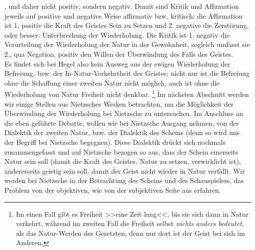\documentclass[12pt, a4paper, openany]{report}
\begin{document}
, und daher nicht positiv, sondern negativ.
Damit sind Kritik und Affirmation jeweils auf positive und negative Weise affirmativ bzw. kritisch:
die Affirmation ist 1. positiv die Kraft des Geistes Sein zu Setzen und 2. negative die Zerstörung, oder besser: 
Unterbrechung der Wiederholung. 
Die Kritik ist 1. negativ die Verurteilung der Wiederholung der Natur in der Gewohnheit, sogleich umfasst sie 2., qua Negation, positiv den Willen der Überwindung des Falls des Geistes.\\

Es findet sich bei Hegel also kein Ausweg aus der ewigen Wiederholung der Befreiung, bzw. der In-Natur-Verkehrtheit des Geistes:
nicht nur ist die Befreiung ohne die Schaffung einer zweiten Natur nicht möglich, auch ist ohne die Wiederholung von Natur Freiheit nicht denkbar.%
\footnote{
    Im einen Fall gibt es Freiheit >>eine Zeit lang<<, bis sie sich dann in Natur verkehrt, während im zweiten Fall die Freiheit selbst \emph{nichts anders bedeutet}, als das Natur-Werden des Gesetzten, denn nur dort ist der Geist bei sich im Anderen.
}
Im nächsten Abschnitt werden wir einige Stellen aus Nietzsches Werken betrachten, um die Möglichkeit der Überwindung der Wiederholung bei Nietzsche zu untersuchen.
Im Anschluss an die eben geführte Debatte, wollen wir bei Nietzsche Ausgang nehmen, von der Dialektik der zweiten Natur, bzw. der Dialektik des Scheins (denn so wird uns der Begriff bei Nietzsche begegnen).
Diese Dialektik drückt sich nochmals zusammengefasst und auf Nietzsche bezogen so aus, dass der Schein einerseits Natur sein soll (damit die Kraft des Geistes, Natur zu setzen, verwirklicht ist), andererseits geistig sein soll, damit der Geist nicht wieder in Natur verfällt. 
Wir werden bei Nietzsche in der Betrachtung des Scheins und des Schauspielers, das Problem von der objektiven, wie von der subjektiven Seite aus erfahren. 
\end{document}
